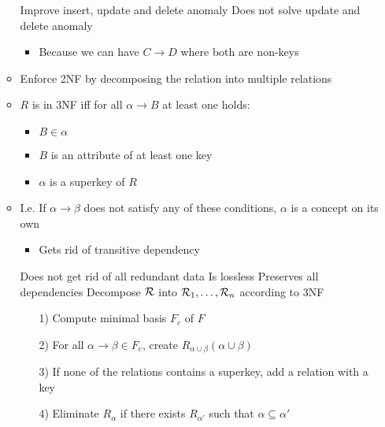 \begin{itemize}
\begin{itemize}
\begin{itemize}
                \end{itemize}
            \ipro Improve insert, update and delete anomaly
            \icon Does not solve update and delete anomaly
                \begin{itemize}
                    \item Because we can have $C \to D$ where both are non-keys
                \end{itemize}
            \item Enforce 2NF by decomposing the relation into multiple relations
        \end{itemize}
        \begin{itemize}
            \item $R$ is in 3NF iff for all $\alpha \to B$ at least one holds:
                \begin{itemize}
                    \item $B \in \alpha$
                    \item $B$ is an attribute of at least one key
                    \item $\alpha$ is a superkey of $R$
                \end{itemize}
            \item I.e. If $\alpha \to \beta$ does not satisfy any of these conditions, $\alpha$ is a concept on its own
                \begin{itemize}
                    \item Gets rid of transitive dependency
                \end{itemize}
            \icon Does not get rid of all redundant data
            \ipro Is lossless
            \ipro Preserves all dependencies
             Decompose $\mathcal{R}$ into $\mathcal{R}_1, \dots, \mathcal{R}_n$ according to 3NF
                \begin{itemize}
                    \item[1)] Compute minimal basis $F_c$ of $F$
                    \item[2)] For all $\alpha \to \beta \in F_c$, create $R_{\alpha \cup \beta}(\alpha \cup \beta)$
                    \item[3)] If none of the relations contains a superkey, add a relation with a key
                    \item[4)] Eliminate $R_\alpha$ if there exists $R_{\alpha'}$ such that $\alpha \subseteq \alpha'$
                \end{itemize}

\end{itemize}
\end{itemize}

